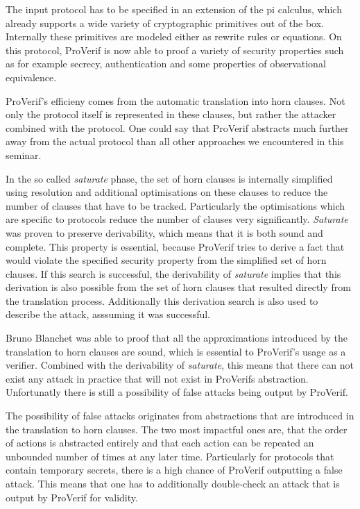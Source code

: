 \documentclass[a4paper,UKenglish]{lipics-v2018}
\begin{document}
The input protocol has to be specified in an extension of the pi calculus, which already supports a wide variety of cryptographic primitives out of the box. Internally these primitives are modeled either as rewrite rules or equations. On this protocol, ProVerif is now able to proof a variety of security properties such as for example secrecy, authentication and some properties of observational equivalence.\cite{ProVerif}

ProVerif's efficieny comes from the automatic translation into horn clauses. Not only the protocol itself is represented in these clauses, but rather the attacker combined with the protocol. One could say that ProVerif abstracts much further away from the actual protocol than all other approaches we encountered in this seminar.\cite{ProVerif}

In the so called \textit{saturate} phase, the set of horn clauses is internally simplified using resolution and additional optimisations on these clauses to reduce the number of clauses that have to be tracked. Particularly the optimisations which are specific to protocols reduce the number of clauses very significantly. \textit{Saturate} was proven to preserve derivability, which means that it is both sound and complete. This property is essential, because ProVerif tries to derive a fact that would violate the specified security property from the simplified set of horn clauses. If this search is successful, the derivability of \textit{saturate} implies that this derivation is also possible from the set of horn clauses that resulted directly from the translation process. Additionally this derivation search is also used to describe the attack, asssuming it was successful.\cite{ProVerif}

Bruno Blanchet was able to proof that all the approximations introduced by the translation to horn clauses are sound, which is essential to ProVerif's usage as a verifier. Combined with the derivability of \textit{saturate}, this means that there can not exist any attack in practice that will not exist in ProVerifs abstraction. Unfortunatly there is still a possibility of false attacks being output by ProVerif.\cite{ProVerif}

The possibility of false attacks originates from abstractions that are introduced in the translation to horn clauses. The two most impactful ones are, that the order of actions is abstracted entirely and that each action can be repeated an unbounded number of times at any later time. Particularly for protocols that contain temporary secrets, there is a high chance of ProVerif outputting a false attack.
This means that one has to additionally double-check an attack that is output by ProVerif for validity. \cite{ProVerif}
\end{document}
